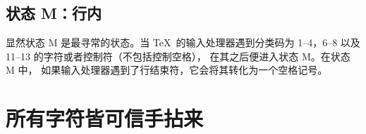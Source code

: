 \documentclass{book}
\begin{document}
\subsection{状态 {\italic M}：行内}

显然状态 {\italic M} 是最寻常的状态。当 \TeX\ 的输入处理器遇到分类码为
1--4，6--8 以及 11--13 的字符或者控制符（不包括控制空格），
在其之后便进入状态 {\italic M}。在状态 {\italic M} 中，
如果输入处理器遇到了行结束符，它会将其转化为一个空格记号。


%

\begin{quotation}
  \figmouth
\end{quotation}

\section{所有字符皆可信手拈来}
\label{hathat}
\end{document}
